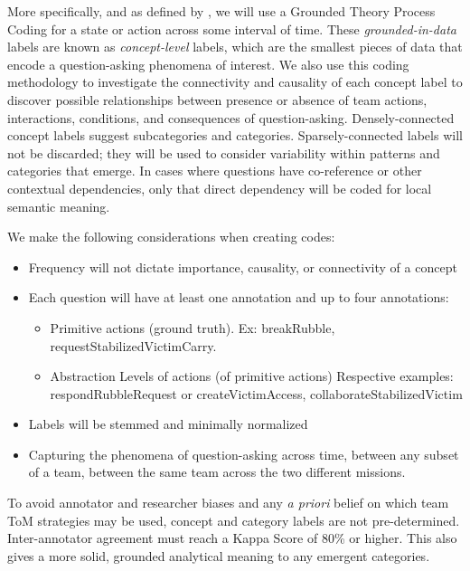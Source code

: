 More specifically, and as defined by \citet{saldana_2021}, we will use a
Grounded Theory Process Coding for a state or action across some interval of
time. These \emph{grounded-in-data} labels are known as \emph{concept-level}
labels, which are the smallest pieces of data that encode a question-asking
phenomena of interest. We also use this coding methodology to investigate the connectivity and
causality of each concept label to discover possible relationships between
presence or absence of team actions, interactions, conditions, and consequences
of question-asking. Densely-connected concept labels suggest subcategories and
categories. Sparsely-connected labels will not be discarded; they will be used
to consider variability within patterns and categories that emerge. In cases
where questions have co-reference or other contextual dependencies, only that
direct dependency will be coded for local semantic meaning.

We make the following considerations when creating codes: 

\begin{itemize}
    \item Frequency will not dictate importance, causality, or connectivity of a concept
    \item Each question will have at least one annotation and up to four
      annotations:
    \begin{itemize}
        \item Primitive actions (ground truth). Ex: breakRubble,
          requestStabilizedVictimCarry.
        \item Abstraction Levels of actions (of primitive actions) Respective
          examples: respondRubbleRequest or createVictimAccess, collaborateStabilizedVictim
    \end{itemize}
    \item Labels will be stemmed and minimally normalized
    \item Capturing the phenomena of question-asking across time, between any subset of a team, between the same team across the two different missions. 
\end{itemize}


To avoid annotator and researcher biases and any \emph{a priori} belief on
which team ToM strategies may be used, concept and category labels are not
pre-determined. Inter-annotator agreement must reach a Kappa Score of 80\% or
higher. This also gives a more solid, grounded analytical meaning to any
emergent categories. 

